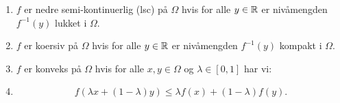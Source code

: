 \begin{enumerate}
  \item \(f\) er nedre semi-kontinuerlig (lsc) på \(\Omega\) hvis for alle \(y \in \mathbb{R}\) er nivåmengden \(f^{-1}(y)\) lukket i \(\Omega\).
  \item \(f\) er koersiv på \(\Omega\) hvis for alle \(y \in \mathbb{R}\) er nivåmengden \(f^{-1}(y)\) kompakt i \(\Omega\).
  \item \(f\) er konveks på \(\Omega\) hvis for alle \(x, y \in \Omega\) og \(\lambda \in [0, 1]\) har vi:
  \item
        \[
          f(\lambda x + (1 - \lambda)y) \leq \lambda f(x) + (1 - \lambda)f(y).
        \]
\end{enumerate}

